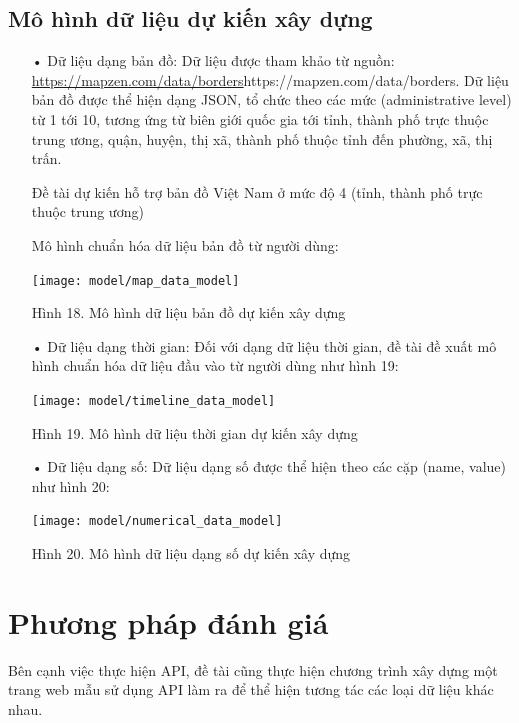 \documentclass[12pt,a4paper]{article}
\begin{document}
\subsection{Mô hình dữ liệu dự kiến xây dựng}
\begin{itemize}
\item[•] Dữ liệu dạng bản đồ: 
Dữ liệu được tham khảo từ nguồn: \url{https://mapzen.com/data/borders}{https://mapzen.com/data/borders}. 
Dữ liệu bản đồ được thể hiện dạng JSON, tổ chức theo các mức (administrative level) từ 1 tới 10, tương ứng từ biên giới quốc gia tới tỉnh, thành phố trực thuộc trung ương, quận, huyện, thị xã, thành phố thuộc tỉnh đến phường, xã, thị trấn.

Đề tài dự kiến hỗ trợ bản đồ Việt Nam ở mức độ 4 (tỉnh, thành phố trực thuộc trung ương)

Mô hình chuẩn hóa dữ liệu bản đồ từ người dùng:
	\begin{center}
    \texttt{[image: model/map\_data\_model]}
    
    Hình 18. Mô hình dữ liệu bản đồ dự kiến xây dựng
    \end{center}

\item[•] Dữ liệu dạng thời gian:
Đối với dạng dữ liệu thời gian, đề tài đề xuất mô hình chuẩn hóa dữ liệu đầu vào từ người dùng như hình 19:
	\begin{center}
    \texttt{[image: model/timeline\_data\_model]}
    
	Hình 19. Mô hình dữ liệu thời gian dự kiến xây dựng
    \end{center}

\item[•] Dữ liệu dạng số:
Dữ liệu dạng số được thể hiện theo các cặp (name, value) như hình 20:
	\begin{center}
    \texttt{[image: model/numerical\_data\_model]}
    
    Hình 20. Mô hình dữ liệu dạng số dự kiến xây dựng
    \end{center}

\end{itemize}

\section{Phương pháp đánh giá}
Bên cạnh việc thực hiện API, đề tài cũng thực hiện chương trình xây dựng một trang web mẫu sử dụng API làm ra để thể hiện tương tác các loại dữ liệu khác nhau.
\end{document}

